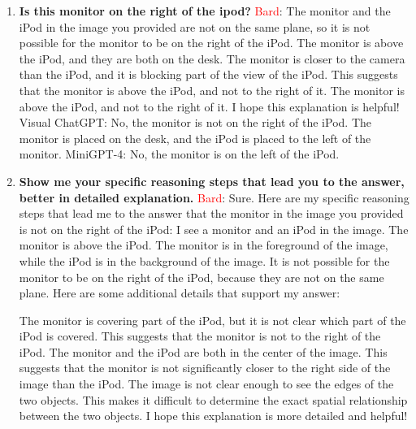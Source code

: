\begin{enumerate}
    Do you have other questions or requests?
    \subitem Visual ChatGPT: The monitor is placed on the desk, and the iPod is placed to the left of the monitor.
    \subitem MiniGPT-4: The monitor and the iPod are on a desk, with the monitor in front of the iPod. The monitor is a computer device that displays images and text on a screen, while the iPod is a portable media player that can store and play music and other media files.
    \item \textbf{Is this monitor on the right of the ipod?}
    \subitem \textcolor{Red}{Bard}: The monitor and the iPod in the image you provided are not on the same plane, so it is not possible for the monitor to be on the right of the iPod. The monitor is above the iPod, and they are both on the desk. The monitor is closer to the camera than the iPod, and it is blocking part of the view of the iPod. This suggests that the monitor is above the iPod, and not to the right of it. The monitor is above the iPod, and not to the right of it.
    I hope this explanation is helpful!
    \subitem Visual ChatGPT: No, the monitor is not on the right of the iPod. The monitor is placed on the desk, and the iPod is placed to the left of the monitor.
    \subitem MiniGPT-4: No, the monitor is on the left of the iPod.
    \item \textbf{Show me your specific reasoning steps that lead you to the answer, better in detailed explanation.}
    \subitem \textcolor{Red}{Bard}: 
    Sure. Here are my specific reasoning steps that lead me to the answer that the monitor in the image you provided is not on the right of the iPod:
    I see a monitor and an iPod in the image.
    The monitor is above the iPod.
    The monitor is in the foreground of the image, while the iPod is in the background of the image.
    It is not possible for the monitor to be on the right of the iPod, because they are not on the same plane.
    Here are some additional details that support my answer:

    The monitor is covering part of the iPod, but it is not clear which part of the iPod is covered. This suggests that the monitor is not to the right of the iPod.
    The monitor and the iPod are both in the center of the image. This suggests that the monitor is not significantly closer to the right side of the image than the iPod.
    The image is not clear enough to see the edges of the two objects. This makes it difficult to determine the exact spatial relationship between the two objects.
    I hope this explanation is more detailed and helpful!


\end{enumerate}
